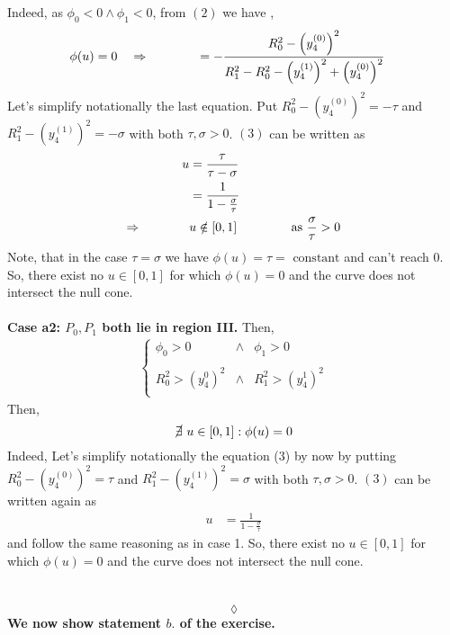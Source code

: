 Indeed, as $\phi_0 < 0\wedge \phi_1  < 0$, from $(2)$ we have ,
\begin{align}
\phi(u)=0\quad\Rightarrow\quad\quad\quad\quad  &= -\frac{R_0^2- \left(y_4^{(0)}\right)^2}{R_1^2-R_0^2  -\left(y_4^{(1)}\right)^2  +\left(y_4^{(0)}\right)^2}
\end{align}
Let's simplify notationally the last equation. Put $R_0^2- \left(y_4^{(0)}\right)^2=-\tau $ and $R_1^2- \left(y_4^{(1)}\right)^2=-\sigma$ with both $\tau, \sigma > 0$. $(3)$ can be written as
\begin{align*}
u&=\frac{\tau}{\tau-\sigma}\\
 &=\frac{1}{1-\frac{\sigma}{\tau}}\\
\Rightarrow\quad\quad\quad\quad &u \notin [0,1] \quad\quad\quad\quad \text{ as } \frac{\sigma}{\tau} >0
\end{align*}
Note, that in the case $\tau=\sigma$ we have $\phi(u)= \tau = \text{ constant}$ and can't reach $0$.
So, there exist no $u\in\left[0,1\right]$ for which $\phi(u)=0$ and the curve does not intersect the null cone.\\\\
\textbf{Case a2: $P_0, P_1$ both lie in region III.} Then,
\begin{align*}
\left\{\begin {matrix}
\phi_0 > 0&\wedge &\phi_1  > 0\\\\
R_0^2 > (y_4^{0})^2 &\wedge &  R_1^2> (y_4^{1})^2 \\
\end{matrix}\right.
\end{align*}
Then, $$\cancel{\exists } \  u \in \left[0,1\right]: \phi(u)=0$$
Indeed,
Let's simplify  notationally the  equation (3) by now by putting $R_0^2- \left(y_4^{(0)}\right)^2=\tau $ and $R_1^2- \left(y_4^{(1)}\right)^2=\sigma$ with both $\tau, \sigma > 0$. $(3)$ can be written again as
\begin{align*}
u& =\frac{1}{1-\frac{\sigma}{\tau}}
\end{align*}
and follow the same reasoning as in case 1.
So, there exist no $u\in\left[0,1\right]$ for which $\phi(u)=0$ and the curve does not intersect the null cone.\\\\
\\$$\lozenge$$
\newpage
\textbf{We now show statement $\mathit{b.}$ of the exercise.}\\\\

